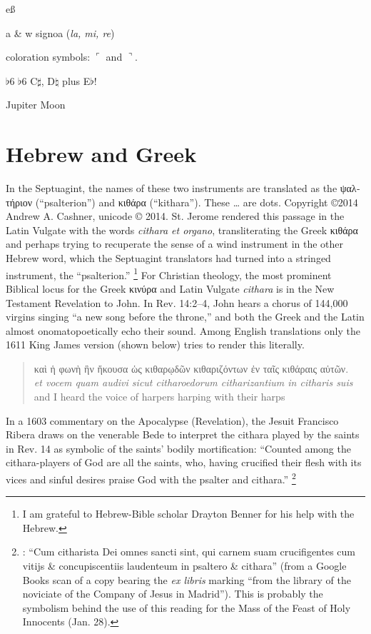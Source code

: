 \documentclass[12pt]{article}
\newcommand{\fl}{$\flat$}
\newcommand{\sh}{$\sharp$}
\newcommand{\na}{$\natural$}
\newcommand{\undertie}{\raisebox{-1ex}{$\smallsmile$}}
\begin{document}
eß

\textgreek{a} \& \textgreek{w} signo\undertie a (\emph{la, mi, re})

coloration symbols: $\ulcorner$ and $\urcorner$.

\fl6 \fl 6 C\sh, D\na{} plus E\fl{}!

Jupiter \jupiter Moon \leftmoon \rightmoon

\section{%
Hebrew and Greek
}

In the Septuagint, the names of these two instruments are translated as the \textgreek{ψαλτήριον} (``psalterion'') and \textgreek{κιθάρα} (``kithara'').
These \dots{} are dots.
Copyright \copyright 2014 Andrew A. Cashner, unicode © 2014.
St. Jerome rendered this passage in the Latin Vulgate with the words \emph{cithara et organo}, transliterating the Greek \textgreek{κιθάρα} and perhaps trying to recuperate the sense of a wind instrument in the other Hebrew word, which the Septuagint translators had turned into a stringed instrument, the ``psalterion.''
\footnote{%
I am grateful to Hebrew-Bible scholar Drayton Benner for his help with the Hebrew. 
}
%
For Christian theology, the most prominent Biblical locus for the Greek \textgreek{κινύρα} and Latin Vulgate \emph{cithara} is in the New Testament Revelation to John.
In Rev. 14:2--4, John hears a chorus of 144,000 virgins singing ``a new song before the throne,'' and both the Greek and the Latin almost onomatopoetically echo their sound.
Among English translations only the 1611 King James version (shown below) tries to render this literally.

\begin{quote}
%
\textgreek{καὶ ἡ φωνὴ ἣν ἤκουσα ὡς κιθαρῳδῶν κιθαριζόντων ἐν ταῖς κιθάραις αὐτῶν.}\\
%
\emph{et vocem quam audivi sicut citharoedorum citharizantium in citharis suis}\\
%
and I heard the voice of harpers harping with their harps
%
\end{quote}

In a 1603 commentary on the Apocalypse (Revelation), the Jesuit Francisco Ribera draws on the venerable Bede to interpret the cithara played by the saints in Rev. 14 as symbolic of the saints' bodily mortification: 
``Counted among the cithara-players of God are all the saints, who, having crucified their flesh with its vices and sinful desires praise God with the psalter and cithara.''%
	\footnote{
	\autocite[429]{Ribera:Apocalypse}: ``Cum citharista Dei omnes sancti sint, qui carnem suam crucifigentes cum vitijs \& concupiscentiis laudenteum in psaltero \& cithara'' (from a Google Books scan of a copy bearing the \emph{ex libris} marking ``from the library of the noviciate of the Company of Jesus in Madrid'').
This is probably the symbolism behind the use of this reading for the Mass of the Feast of Holy Innocents (Jan. 28).
	} 
\end{document}
